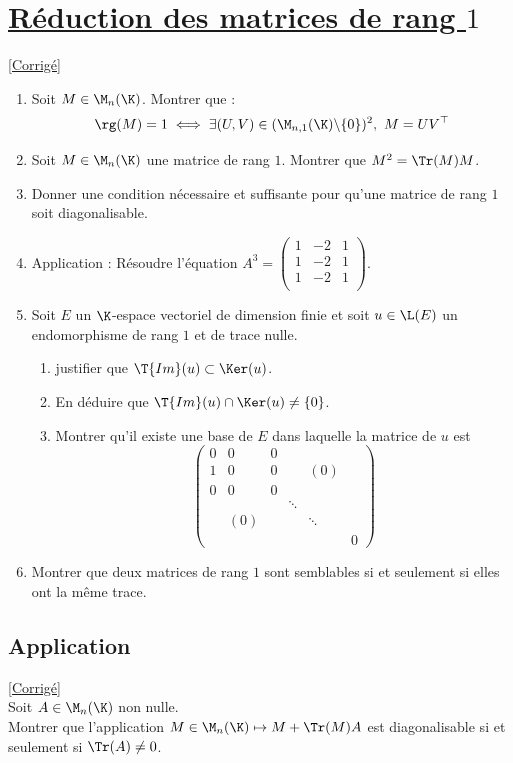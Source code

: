 \documentclass[8pt]{book}
\begin{document}
	\section{\underline{Réduction des matrices de rang $1$} }
	\label{Réduction des matrices de rang 1}
	\textcolor{blue}{\hyperref[Réduction des matrices de rang 1 corrigé]{[Corrigé]}}\\
	\begin{enumerate}[leftmargin=*]
		\item Soit $M\in \M_n(\K)$.
		Montrer que :\[\rg(M)=1 \iff \exists (U,V)\in (\M_{n,1}(\K)\backslash\{0\})^2,\ M=UV^\top\]
		\item Soit $M\in \M_n(\K)$ une matrice de rang $1$. Montrer que $M^2=\Tr(M)M$.
		\item Donner une condition nécessaire et suffisante pour qu'une matrice de rang $1$ soit diagonalisable.
		\item Application : Résoudre l'équation $A^3=\begin{pmatrix}
			1 &-2 &1\\
			1 &-2 &1\\
			1 &-2 &1\\
		\end{pmatrix}$.
		\item Soit $E$ un $\K$-espace vectoriel de dimension finie et soit $u\in \L(E)$ un endomorphisme de rang $1$ et de trace nulle.
		\begin{enumerate}[label=\alph*.]
			\item justifier que $\T{Im}(u)\subset\Ker(u)$.
			\item En déduire que $\T{Im}(u)\cap\Ker(u)\ne\{0\}$.
			\item Montrer qu'il existe une base de $E$ dans laquelle la matrice de $u$ est
			$$\begin{pmatrix}
				0&0&0&&&\\
				1&0&0&&(0)&\\
				0&0&0&&&\\
				&&&\ddots&&\\
				&(0)&&&\ddots&\\
				&&&&&0
			\end{pmatrix}$$
		\end{enumerate}
		\item Montrer que deux matrices de rang $1$ sont semblables si et seulement si elles ont la même trace.
	\end{enumerate}
	
	\subsection{Application }
	\label{Application}
	\textcolor{blue}{\hyperref[Application corrigé]{[Corrigé]}}\\
	Soit $A\in \M_n(\K)$ non nulle.\\
	Montrer que l'application $M\in \M_n(\K)\mapsto M+\Tr(M)A$ est diagonalisable si et seulement si $\Tr(A)\ne 0$.
	
\end{document}
